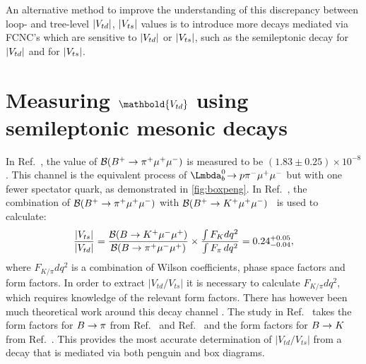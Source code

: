 An alternative method to improve the understanding of this discrepancy between loop- and tree-level $|{V_{{t}{d}}}|$, $|{V_{{t}{s}}}|$ values is to introduce more decays mediated via FCNC's which are sensitive to $|{V_{{t}{d}}}|$ or $|{V_{{t}{s}}}|$, such as the semileptonic decay \Lbpi for $|{V_{{t}{d}}}|$ and \LbK for $|{V_{{t}{s}}}|$.

\section[Measuring \Vtd using semileptonic mesonic decays]{Measuring $\mathbold{\Vtd}$ using semileptonic mesonic decays}
\label{sec:bpipi}
In Ref.~\cite{pimumunew}, the value of ${\cal B}({{B}^+}\rightarrow{\ensuremath{{\pi}^+}}{\ensuremath{\mu^+\mu^-}})$ is measured to be $(1.83\pm0.25) \times 10^{-8}$. This channel is the equivalent process of $\Lbpi$ but with one fewer spectator quark, as demonstrated in \autoref{fig:boxpeng}. In Ref.~\cite{pimumunew}, the combination of ${\cal B}({{B}^+}\rightarrow{\ensuremath{{\pi}^+}}{\ensuremath{\mu^+\mu^-}})$ with ${\cal B}({{B}^+}\rightarrow{\ensuremath{{K}^+}}{\ensuremath{\mu^+\mu^-}})$~\cite{bKmumu} is used to calculate: %
\begin{equation}
  \frac{|V_{ts}|}{|V_{td}|} = \frac{{\cal B}({B}\rightarrow{\ensuremath{{K}^+}}{\ensuremath{\mu^-}}{\ensuremath{\mu^+}})}{{\cal B}({B}\rightarrow{\ensuremath{{\pi}^+}}{\ensuremath{\mu^-}}{\ensuremath{\mu^+}})} \times \frac{\int F_{K}d q^{2}}{\int F_{\pi}\,dq^{2}} = 0.24^{+0.05}_{-0.04},
  \end{equation}
where $F_{K/\pi}d q^{2}$ is a combination of Wilson coefficients, phase space factors and form factors. In order to extract $|V_{td}/V_{ts}|$ it is necessary to calculate $F_{K/\pi}d q^{2}$, which requires knowledge of the relevant form factors.  There has however been much theoretical work around this decay channel \cite{bpipi_th_1,bpipi_th_2,bpipi_th_3,bpipi_th_4, bpimumuff1, bpimumuff2}. The study in Ref.~\cite{pimumunew} takes the form factors for ${B}\rightarrow\pi$ from Ref.~\cite{bpimumuff1} and Ref.~\cite{bpimumuff2} and the form factors for ${B}\rightarrow K$ from Ref.~\cite{bKmumuff1}. This provides the most accurate determination of $|V_{td}/V_{ts}|$ from a decay that is mediated via both penguin and box diagrams.%

